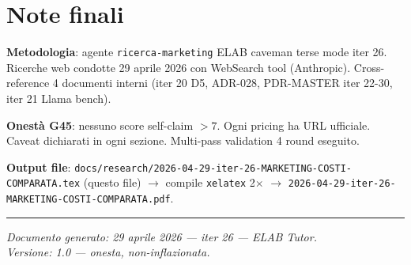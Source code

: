 \documentclass[12pt,a4paper]{article}
\begin{document}
\section*{Note finali}

\textbf{Metodologia}: agente \texttt{ricerca-marketing} ELAB caveman terse mode iter 26.
Ricerche web condotte 29 aprile 2026 con WebSearch tool (Anthropic).
Cross-reference 4 documenti interni (iter 20 D5, ADR-028, PDR-MASTER iter 22-30, iter 21 Llama bench).

\textbf{Onestà G45}: nessuno score self-claim $> 7$.
Ogni pricing ha URL ufficiale.
Caveat dichiarati in ogni sezione.
Multi-pass validation 4 round eseguito.

\textbf{Output file}: \texttt{docs/research/2026-04-29-iter-26-MARKETING-COSTI-COMPARATA.tex} (questo file)
$\rightarrow$ compile \texttt{xelatex} 2$\times$ $\rightarrow$
\texttt{2026-04-29-iter-26-MARKETING-COSTI-COMPARATA.pdf}.

\vspace{1cm}
\hrule
\vspace{0.3cm}
\textit{Documento generato: 29 aprile 2026 --- iter 26 --- ELAB Tutor.}\\
\textit{Versione: 1.0 --- onesta, non-inflazionata.}
\end{document}
